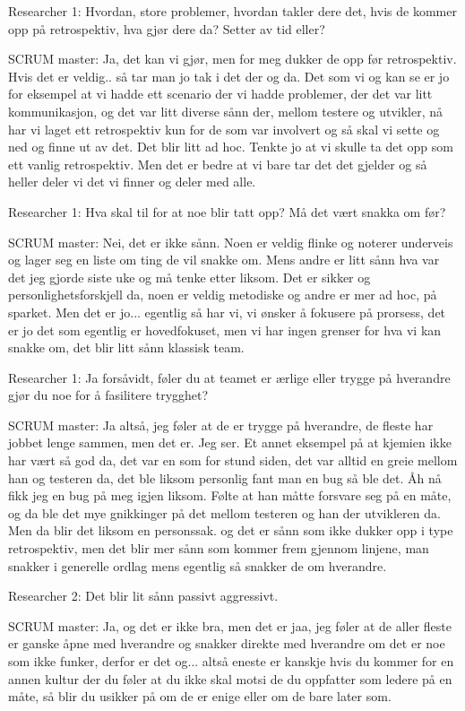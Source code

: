 Researcher 1: Hvordan, store problemer, hvordan takler dere det, hvis de kommer opp på retrospektiv, hva gjør dere da? Setter av tid eller?

SCRUM master: Ja, det kan vi gjør, men for meg dukker de opp før retrospektiv. Hvis det er veldig.. så tar man jo tak i det der og da. Det som vi og kan se er jo for eksempel at vi hadde ett scenario der vi hadde problemer, der det var litt kommunikasjon, og det var litt diverse sånn der, mellom testere og utvikler, nå har vi laget ett retrospektiv kun for de som var involvert og så skal vi sette og ned og finne ut av det. Det blir litt ad hoc. Tenkte jo at vi skulle ta det opp som ett vanlig retrospektiv. Men det er bedre at vi bare tar det det gjelder og så heller deler vi det vi finner og deler med alle.

Researcher 1: Hva skal til for at noe blir tatt opp? Må det vært snakka om før?

SCRUM master: Nei, det er ikke sånn. Noen er veldig flinke og noterer underveis og lager seg en liste om ting de vil snakke om. Mens andre er litt sånn hva var det jeg gjorde siste uke og må tenke etter liksom. Det er sikker og personlighetsforskjell da, noen er veldig metodiske og andre er mer ad hoc, på sparket. Men det er jo... egentlig så har vi, vi ønsker å fokusere på prorsess, det er jo det som egentlig er hovedfokuset, men vi har ingen grenser for hva vi kan snakke om, det blir  litt sånn klassisk team.

Researcher 1: Ja forsåvidt, føler du at teamet er ærlige eller trygge på hverandre gjør du noe for å fasilitere trygghet? 

SCRUM master: Ja altså, jeg føler at de er trygge på hverandre, de fleste har jobbet lenge sammen, men det er. Jeg ser. Et annet eksempel på at kjemien ikke har vært så god da, det var en som for stund siden, det var alltid en greie mellom han og testeren da, det ble liksom personlig fant man en bug så ble det. Åh nå fikk jeg en bug på meg igjen liksom. Følte at han måtte forsvare seg på en måte, og da ble det mye gnikkinger på det mellom testeren og han der utvikleren da. Men da blir det liksom en personssak. og det er sånn som ikke dukker opp i type retrospektiv, men det blir mer sånn som kommer frem gjennom linjene, man snakker i generelle ordlag mens egentlig så snakker de om hverandre.

Researcher 2: Det blir lit sånn passivt aggressivt. 

SCRUM master: Ja, og det er ikke bra, men det er jaa, jeg føler at de aller fleste er ganske åpne med hverandre og snakker direkte med hverandre om det er noe som ikke funker, derfor er det og... altså eneste er kanskje hvis du kommer for en annen kultur der du føler at du ikke skal motsi de du oppfatter som ledere på en måte, så blir du usikker på om de er enige eller om de bare later som.

